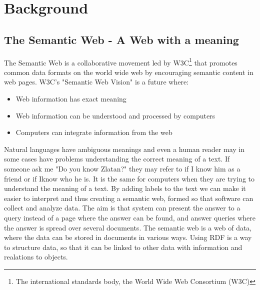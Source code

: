 \chapter{Background}

\section{The Semantic Web - A Web with a meaning} 
The Semantic Web is a collaborative movement led by W3C\footnote{The international standards body, the World Wide Web Consortium (W3C)} that promotes common data formats on the world wide web by encouraging semantic content in web pages.\cite{semWebBib} W3C's "Semantic Web Vision" is a future where: 
\begin{itemize}
\item Web information has exact meaning
\item Web information can be understood and processed by computers
\item Computers can integrate information from the web 
\end{itemize}

Natural languages have ambiguous meanings and even
a human reader may in some cases have problems understanding the correct
meaning of a text. If someone ask me  "Do you know Zlatan?" they may refer to if I know him as a friend or if Iknow who he is. It is the same for computers when they are trying to understand the meaning of a text. By adding labels to the text we can make it easier to interpret and thus creating a semantic web, formed so that software can collect and analyze data. The aim is that system can present the answer to a query instead of a page where the answer can be found, and answer queries where the answer is spread over several documents.
The semantic web is a web of data, where the data can be stored in documents in various ways. Using RDF is a way to structure data, so that it can be linked to other data with information and realations to objects.

